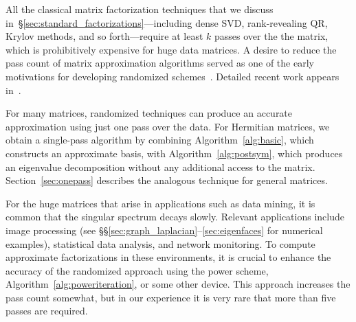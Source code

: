 \documentclass[final]{siamltex}
\newcounter{algorithm}[section]
\begin{document}
All the classical matrix factorization techniques that we
discuss in~\S\ref{sec:standard_factorizations}---including
dense SVD, rank-revealing QR, Krylov methods, and so
forth---require at least $k$ passes over the the matrix, which is
prohibitively expensive for huge data matrices.
A desire to reduce the pass count of matrix approximation
algorithms served as one of the early motivations for
developing randomized schemes~\cite{papadimitriou,kannan_vempala,drineas_kannan_mahoney}.
Detailed recent work appears in~\cite{2009_clarkson_woodruff}.

For many matrices, randomized techniques can produce an accurate
approximation using just one pass over the data.  For Hermitian
matrices, we obtain a single-pass algorithm by combining
Algorithm~\ref{alg:basic}, which constructs an approximate basis,
with Algorithm~\ref{alg:postsym}, which produces an eigenvalue
decomposition without any additional access to the matrix.
Section~\ref{sec:onepass} describes the analogous technique
for general matrices.

For the huge matrices that arise in applications such as data mining,
it is common that the singular spectrum
decays slowly.  Relevant applications include image processing
(see \S\S\ref{sec:graph_laplacian}--\ref{sec:eigenfaces}
for numerical examples), statistical data analysis,
and network monitoring.  To compute approximate
factorizations in these environments, it is crucial
to enhance the accuracy of the randomized approach
using the power scheme, Algorithm~\ref{alg:poweriteration},
or some other device.  This approach increases the
pass count somewhat, but in our experience it is very rare
that more than five passes are required.


\end{document}
